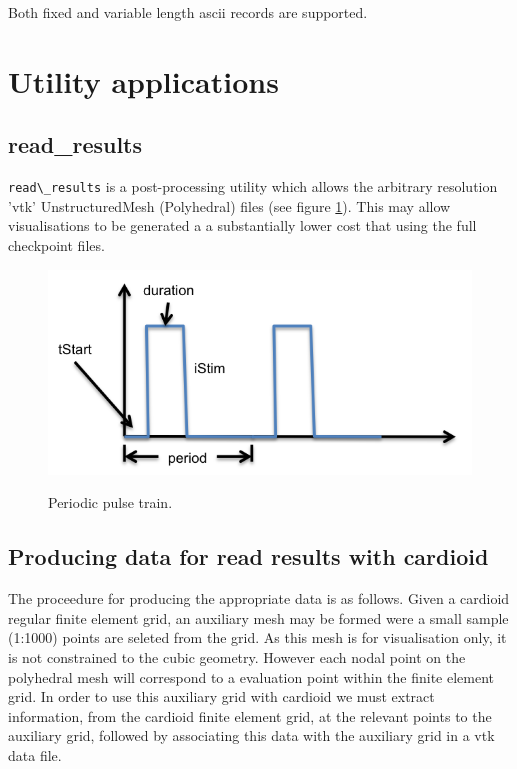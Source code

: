 \documentclass{article}
\begin{document}
Both fixed and variable length ascii records are supported.

\section{Utility applications}
\label{sec:utility}

\subsection{read\_results}
\verb|read\_results| is a post-processing utility which allows the arbitrary
resolution 'vtk' UnstructuredMesh (Polyhedral) files (see figure \ref{fig:grid_comparsion}). This may allow visualisations
to be generated a a substantially lower cost that using the full checkpoint
files.
\begin{figure}
  {\centering\includegraphics{graphics/pulseTrain.png}}
  \caption{Periodic pulse train.}
  \label{fig:grid_comparsion}
\end{figure}

\subsection{Producing data for read results with cardioid}
The proceedure for producing the appropriate data is as follows. Given a cardioid regular
finite element grid, an auxiliary mesh may be formed were a small sample (1:1000)
points are seleted from the grid. As this mesh is for visualisation only, it is not
constrained to the cubic geometry. However each nodal point on the polyhedral mesh
will correspond to a evaluation point within the finite element grid. In order
to use this auxiliary grid with cardioid we must extract information, from the cardioid
finite element grid, at the relevant points to the auxiliary grid, followed by
associating this data with the auxiliary grid in a vtk data file.
\end{document}
